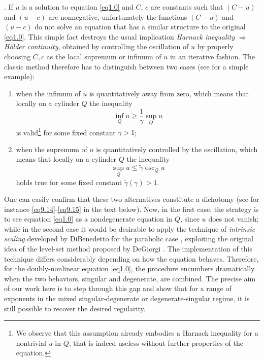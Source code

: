 \documentclass[a4paper,11pt,fullpage]{article}
\DeclareMathOperator*{\osc}{osc}
\numberwithin{equation}{section}
\begin{document}
\vskip0.2cm . If $u$ is a solution to equation \eqref{eq1.0} and $C$, $c$ are constants such that $(C-u)$ and $(u-c)$ are nonnegative, unfortunately the functions $(C-u)$ and $(u-c)$ do not solve an equation that has a similar structure to the original \eqref{eq1.0}. This simple fact destroys the usual implication {\it Harnack inequality} $\Rightarrow$ {\it H\"older continuity}, obtained by controlling the oscillation of $u$ by properly choosing $C,c$ as the local supremum or infimum of $u$ in an iterative fashion. The classic method therefore has to distinguish between two cases (see \cite{CV} for a simple example):
\begin{enumerate}
    \item when the infimum of $u$ is quantitatively away from zero, which means that locally on a cylinder $Q$ the inequality
\[\inf_Q u \geqslant\frac{1}{\gamma} \sup_Q u\] is valid\footnote{We observe that this assumption already embodies a Harnack inequality for a nontrivial $u$ in $Q$, that is indeed useless without further properties of the equation.} for some fixed constant $\gamma>1$;
\item when the supremum of $u$ is quantitatively controlled by the oscillation, which means that locally on a cylinder $Q$ the inequality
\[\sup_Q u \leqslant  \tilde{\gamma} \osc_Q u\] holds true for some fixed constant $\tilde{\gamma}(\gamma)>1$.
\end{enumerate}
One can easily confirm that these two alternatives constitute a dichotomy (see for instance \eqref{eq9.14}-\eqref{eq9.15} in the text below). Now, in the first case, the strategy is to see equation \eqref{eq1.0} as a nondegenerate equation in $Q$, since $u$ does not vanish; while in the second case it would be desirable to apply the technique of {\it intrinsic scaling} developed by DiBenedetto  for the parabolic case \cite{DiB1993}, exploiting the original idea of the level-set method proposed by DeGiorgi \cite{DG}. The implementation of this technique differs considerably depending on how the equation behaves. Therefore, for the doubly-nonlinear equation \eqref{eq1.0}, the procedure encumbers dramatically when the two behaviors, singular and degenerate, are combined. The precise aim of our work here is to step through this gap and show that for a range of exponents in the mixed singular-degenerate or degenerate-singular regime, it is still possible to recover the desired regularity.
\end{document}
